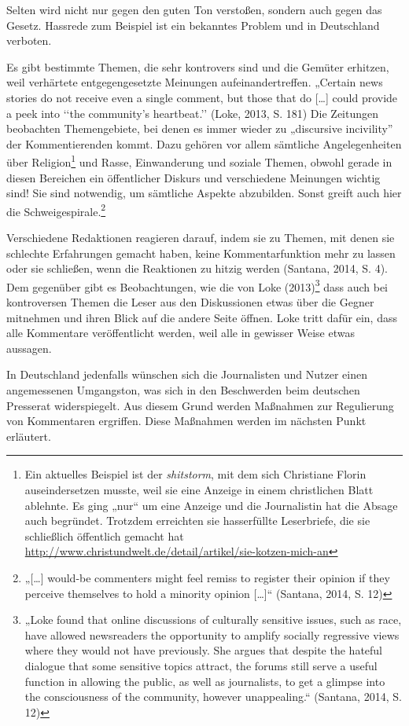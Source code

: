 \begin{enumerate}
Selten wird nicht nur gegen den guten Ton verstoßen, sondern auch gegen das
Gesetz. Hassrede zum Beispiel ist ein bekanntes Problem und in Deutschland
verboten.

Es gibt bestimmte Themen, die sehr kontrovers sind und die Gemüter erhitzen,
weil verhärtete entgegengesetzte Meinungen aufeinandertreffen.   „Certain news
stories do not receive even a single comment, but those that do [\ldots] could
provide a peek into ‘‘the community’s heartbeat.’’ (Loke, 2013, S. 181)
Die Zeitungen beobachten Themengebiete, bei denen es immer wieder zu „discursive
incivility” der Kommentierenden kommt. Dazu gehören vor allem sämtliche
Angelegenheiten über Religion\footnote{Ein aktuelles Beispiel ist der
{\slshape shitstorm}, mit dem sich Christiane Florin auseindersetzen musste, weil
sie eine Anzeige in einem christlichen Blatt ablehnte. Es ging „nur“ um eine
Anzeige und die Journalistin hat die Absage auch begründet. Trotzdem erreichten
sie hasserfüllte Leserbriefe, die sie schließlich öffentlich gemacht hat
\url{http://www.christundwelt.de/detail/artikel/sie-kotzen-mich-an}} und Rasse,
Einwanderung und soziale Themen, obwohl gerade in diesen Bereichen ein
öffentlicher Diskurs und verschiedene Meinungen wichtig sind! Sie sind
notwendig, um sämtliche Aspekte abzubilden. Sonst greift auch hier die
Schweigespirale.\footnote{„[\ldots] would-be commenters might feel remiss
to register their opinion if they perceive themselves to hold a minority opinion
[\ldots]“ (Santana, 2014, S. 12)}


Verschiedene Redaktionen reagieren darauf, indem sie zu Themen, mit denen sie
schlechte Erfahrungen gemacht haben, keine Kommentarfunktion mehr zu lassen oder
sie schließen, wenn die Reaktionen zu hitzig werden (Santana, 2014, S. 4). 
Dem gegenüber gibt es Beobachtungen, wie die von Loke (2013)\footnote{„Loke
found that online discussions of culturally sensitive issues, such as race, have
allowed newsreaders the opportunity to amplify socially regressive views where
they would not have previously. She argues that despite the hateful dialogue
that some sensitive topics attract, the forums still serve a useful function in
allowing the public, as well as journalists, to get a glimpse into the
consciousness of the community, however unappealing.“ (Santana, 2014, S. 12)}
dass auch bei kontroversen Themen die Leser aus den Diskussionen etwas über die
Gegner mitnehmen und ihren Blick auf die andere Seite öffnen. Loke tritt dafür
ein, dass alle Kommentare veröffentlicht werden, weil alle in gewisser Weise
etwas aussagen. 

In Deutschland jedenfalls wünschen sich die Journalisten und Nutzer einen
angemessenen Umgangston, was sich in den Beschwerden beim deutschen Presserat
widerspiegelt. Aus diesem Grund werden Maßnahmen zur Regulierung von Kommentaren
ergriffen. Diese Maßnahmen werden im nächsten Punkt erläutert.



\end{enumerate}
















